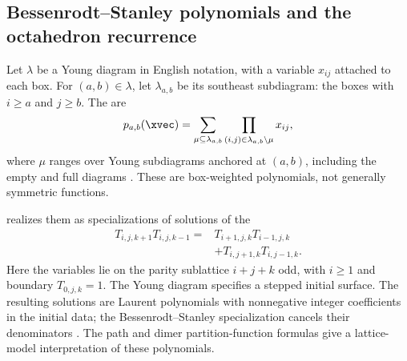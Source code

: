 \subsection[bessenrodtStanleyPolynomials]{Bessenrodt--Stanley polynomials and the octahedron recurrence}

Let $\lambda$ be a Young diagram in English notation, with a variable
$x_{ij}$ attached to each box. For $(a,b)\in\lambda$, let
$\lambda_{a,b}$ be its southeast subdiagram: the boxes with
$i\geq a$ and $j\geq b$.
The  are
\[
 p_{a,b}(\xvec)
 =\sum_{\mu\subseteq\lambda_{a,b}}
   \prod_{(i,j)\in\lambda_{a,b}\setminus\mu}x_{ij},
\]
where $\mu$ ranges over Young subdiagrams anchored at $(a,b)$,
including the empty and full diagrams
\cite[Eq.~(4.5)]{DiFrancesco2015}.
These are box-weighted polynomials, not generally symmetric functions.

 realizes them as specializations of
solutions of the 
\[
 \begin{aligned}
 T_{i,j,k+1}T_{i,j,k-1}
 ={}&T_{i+1,j,k}T_{i-1,j,k}\\
 &+T_{i,j+1,k}T_{i,j-1,k}.
 \end{aligned}
\]
Here the variables lie on the parity sublattice $i+j+k$ odd,
with $i\geq1$ and boundary $T_{0,j,k}=1$.
The Young diagram specifies a stepped initial surface.
The resulting solutions are Laurent polynomials with nonnegative
integer coefficients in the initial data; the Bessenrodt--Stanley
specialization cancels their denominators
\cite[Thms.~2.2 and 2.4]{DiFrancesco2015}.
The path and dimer partition-function formulas
\cite[Thms.~4.2 and 4.4]{DiFrancesco2015}
give a lattice-model interpretation of these polynomials.
